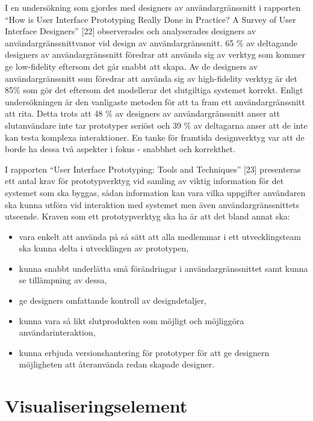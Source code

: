 \documentclass[12pt]{kththesis}
\begin{document}
I en undersökning som gjordes med designers av användargränssnitt i rapporten “How is User Interface Prototyping Really Done in Practice? A Survey of User Interface Designers” [22] observerades och analyserades designers av användargränssnittvanor vid design av användargränssnitt. 65 \% av deltagande designers av användargränssnitt föredrar att använda sig av verktyg som kommer ge low-fidelity eftersom det går snabbt att skapa. Av de designers av användargränssnitt som föredrar att använda sig av high-fidelity verktyg är det 85\% som gör det eftersom det modellerar det slutgiltiga systemet korrekt. Enligt undersökningen är den vanligaste metoden för att ta fram ett användargränssnitt att rita. Detta trots att 48 \% av designers av användargränssnitt anser att slutanvändare inte tar prototyper seriöst och 39 \% av deltagarna anser att de inte kan testa komplexa interaktioner.  En tanke för framtida designverktyg var att de borde ha dessa två aspekter i fokus - snabbhet och korrekthet. 

I rapporten “User Interface Prototyping: Tools and Techniques” [23] presenteras ett antal krav för prototypverktyg vid samling av viktig information för det systemet som ska byggas, sådan information kan vara vilka uppgifter användaren ska kunna utföra vid interaktion med systemet men även användargränssnittets utseende. Kraven som ett prototypverktyg ska ha är att det bland annat ska: 

\begin{itemize}
\item vara enkelt att använda på så sätt att alla medlemmar i ett utvecklingsteam ska kunna delta i utvecklingen av prototypen,
\item kunna snabbt underlätta små förändringar i användargränssnittet samt kunna se tillämpning av dessa,
\item ge designers omfattande kontroll av designdetaljer,
\item kunna vara så likt slutprodukten som möjligt och möjliggöra användarinteraktion,
\item kunna erbjuda versionshantering för prototyper för att ge designern möjligheten att återanvända redan skapade designer.

\end{itemize}

\section{Visualiseringselement} 
\end{document}
